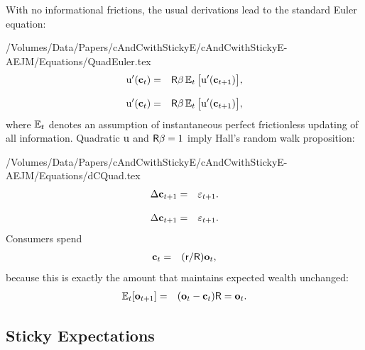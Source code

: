 \documentclass[titlepage]{./econtex}
\begin{document}
With no informational frictions, the usual derivations lead to the standard Euler equation:
\begin{verbatimwrite}{/Volumes/Data/Papers/cAndCwithStickyE/cAndCwithStickyE-AEJM/Equations/QuadEuler.tex}
\begin{eqnarray*}
  {\mathrm{u}}^{\prime}(\mathbf{c}_{t}) & = & \mathsf{R}\beta \operatorname{\mathbb{E}}_{t}\big[{\mathrm{u}}^{\prime}(\mathbf{c}_{t+1})\big], \label{eq:QuadEuler}
\end{eqnarray*}
\end{verbatimwrite}
\begin{eqnarray*}
  {\mathrm{u}}^{\prime}(\mathbf{c}_{t}) & = & \mathsf{R}\beta \operatorname{\mathbb{E}}_{t}\big[{\mathrm{u}}^{\prime}(\mathbf{c}_{t+1})\big], \label{eq:QuadEuler}
\end{eqnarray*}
 where $\operatorname{\mathbb{E}}_{t}$ denotes an assumption of instantaneous perfect frictionless updating of all information. Quadratic ${\mathrm{u}}$ and $\mathsf{R} \beta=1$ imply Hall's random walk proposition:
\begin{verbatimwrite}{/Volumes/Data/Papers/cAndCwithStickyE/cAndCwithStickyE-AEJM/Equations/dCQuad.tex}
\begin{eqnarray*}
  \Delta \mathbf{c}_{t+1} & = & \varepsilon_{t+1} \label{eq:dCQuad}.
\end{eqnarray*}
\end{verbatimwrite}
\begin{eqnarray*}
  \Delta \mathbf{c}_{t+1} & = & \varepsilon_{t+1} \label{eq:dCQuad}.
\end{eqnarray*}
 Consumers spend
\begin{eqnarray*}
  \mathbf{c}_{t} & = & (\mathsf{r}/\mathsf{R}) \mathbf{o}_{t}, \label{eq:cquad}
\end{eqnarray*}
because this is exactly the amount that maintains expected wealth unchanged:
\begin{eqnarray*}
  \operatorname{\mathbb{E}}_{t}[\mathbf{o}_{t+1}] & = & (\mathbf{o}_{t}-\mathbf{c}_{t})\mathsf{R} = \mathbf{o}_{t}
.
\end{eqnarray*}


\subsection{Sticky Expectations}
\end{document}
